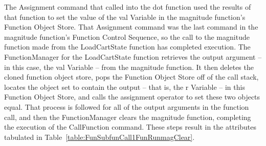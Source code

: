 The Assignment command that called into the dot function used the results of that function to set
the value of the val Variable in the magnitude function's Function Object Store.  That Assignment
command was the last command in the magnitude function's Function Control Sequence, so the call to
the magnitude function made from the LoadCartState function has completed execution.  The
FunctionManager for the LoadCartState function retrieves the output argument -- in this case, the
val Variable -- from the magnitude function.  It then deletes the cloned function object store, pops
the Function Object Store off of the call stack, locates the object set to contain the output --
that is, the r Variable -- in this Function Object Store, and calls the assignment operator to set
these two objects equal.  That process is followed for all of the output arguments in the function
call, and then the FunctionManager clears the magnitude function, completing the execution of the
CallFunction command.  These steps result in the attributes tabulated in
Table~\ref{table:FunSubfunCall1FunRunmagClear}.

